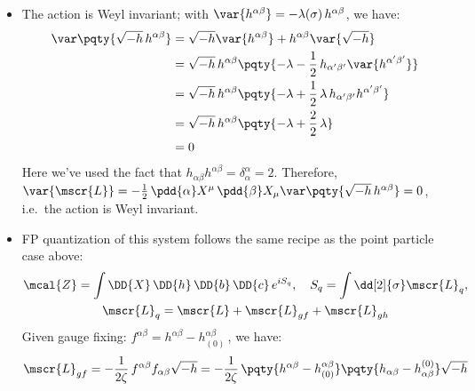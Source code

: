 \documentclass[a4paper,10pt]{article}
\begin{document}
\begin{itemize}
	\item The action is Weyl invariant; with $
		\var{h^{\alpha\beta}}
		= -\lambda(\sigma)\,h^{\alpha\beta}
	$, we have:
	\begin{equation}
	\begin{aligned}
		\var\pqty{
			\sqrt{-h}\,h^{\alpha\beta}
		}
		&= \sqrt{-h}
				\var{h^{\alpha\beta}}
			+ h^{\alpha\beta}
				\var{\sqrt{-h}} \\
		&= \sqrt{-h}\,h^{\alpha\beta} \pqty{
			- \lambda
			- \frac{1}{2}\,
				h_{\alpha'\beta'}
				\var{h^{\alpha'\beta'}}
		} \\
		&= \sqrt{-h}\,h^{\alpha\beta} \pqty{
			- \lambda
			+ \frac{1}{2}\,\lambda\,
				h_{\alpha'\beta'}
				h^{\alpha'\beta'}
		} \\
		&= \sqrt{-h}\,h^{\alpha\beta} \pqty{
			- \lambda
			+ \frac{2}{2}\,\lambda
		} \\
		&= 0
	\end{aligned}
	\end{equation}
	Here we've used the fact that $
		h_{\alpha\beta} h^{\alpha\beta}
		= \delta^\alpha_\alpha
		= 2
	$. Therefore, $
		\var{\mscr{L}}
		= -\frac{1}{2}\,
			\pdd{\alpha} X^\mu\,
			\pdd{\beta} X_\mu
			\var\pqty{
				\sqrt{-h}\,h^{\alpha\beta}
			}
		= 0
	$, i.e.\ the action is Weyl invariant. 
	
	\item FP quantization of this system follows the same recipe as the point particle case above: 
	\begin{gather}
		\mcal{Z}
		= \int \DD{X}\,\DD{h}\,\DD{b}\,\DD{c}\,
			e^{iS_{q}},\quad
		S_q = \int \dd[2]{\sigma} \mscr{L}_q,\\
		\mscr{L}_q
		= \mscr{L} + \mscr{L}_{gf} + \mscr{L}_{gh}
	\end{gather}
	Given gauge fixing: $
		f^{\alpha\beta}
		= h^{\alpha\beta} - h^{\alpha\beta}_{(0)}
	$\,, we have:
	\begin{equation}
		\mscr{L}_{gf}
		= -\frac{1}{2\zeta}\,
			f^{\alpha\beta}
			f_{\alpha\beta} \sqrt{-h}
		= -\frac{1}{2\zeta}\,\pqty{
				h^{\alpha\beta}
				- h^{\alpha\beta}_{(0)}
			} \pqty{
				h_{\alpha\beta}
				- h_{\alpha\beta}^{(0)}
			} \sqrt{-h}
	\end{equation}
	
	

\end{itemize}
\end{document}
